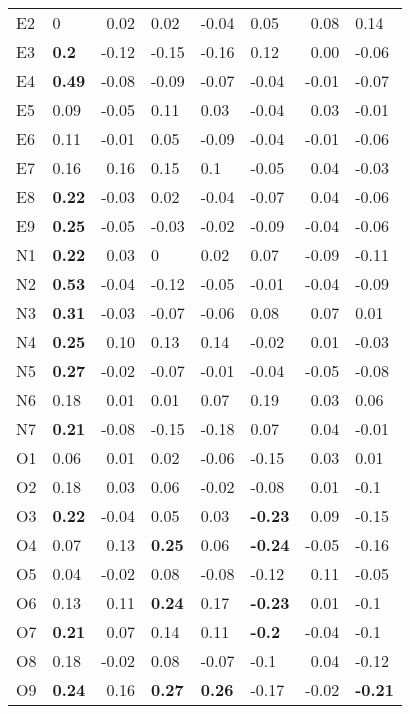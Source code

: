 \documentclass[man]{apa6}
\theoremstyle{definition}
\theoremstyle{definition}
\theoremstyle{definition}
\theoremstyle{remark}
\begin{document}
\begin{table}[ht]
\begin{tabular}{llrlllrl}
  E2 & 0 & 0.02 & 0.02 & -0.04 & 0.05 & 0.08 & 0.14 \\ 
  E3 & \textbf{0.2} & -0.12 & -0.15 & -0.16 & 0.12 & 0.00 & -0.06 \\ 
  E4 & \textbf{0.49} & -0.08 & -0.09 & -0.07 & -0.04 & -0.01 & -0.07 \\ 
  E5 & 0.09 & -0.05 & 0.11 & 0.03 & -0.04 & 0.03 & -0.01 \\ 
  E6 & 0.11 & -0.01 & 0.05 & -0.09 & -0.04 & -0.01 & -0.06 \\ 
  E7 & 0.16 & 0.16 & 0.15 & 0.1 & -0.05 & 0.04 & -0.03 \\ 
  E8 & \textbf{0.22} & -0.03 & 0.02 & -0.04 & -0.07 & 0.04 & -0.06 \\ 
  E9 & \textbf{0.25} & -0.05 & -0.03 & -0.02 & -0.09 & -0.04 & -0.06 \\ 
  N1 & \textbf{0.22} & 0.03 & 0 & 0.02 & 0.07 & -0.09 & -0.11 \\ 
  N2 & \textbf{0.53} & -0.04 & -0.12 & -0.05 & -0.01 & -0.04 & -0.09 \\ 
  N3 & \textbf{0.31} & -0.03 & -0.07 & -0.06 & 0.08 & 0.07 & 0.01 \\ 
  N4 & \textbf{0.25} & 0.10 & 0.13 & 0.14 & -0.02 & 0.01 & -0.03 \\ 
  N5 & \textbf{0.27} & -0.02 & -0.07 & -0.01 & -0.04 & -0.05 & -0.08 \\ 
  N6 & 0.18 & 0.01 & 0.01 & 0.07 & 0.19 & 0.03 & 0.06 \\ 
  N7 & \textbf{0.21} & -0.08 & -0.15 & -0.18 & 0.07 & 0.04 & -0.01 \\ 
  O1 & 0.06 & 0.01 & 0.02 & -0.06 & -0.15 & 0.03 & 0.01 \\ 
  O2 & 0.18 & 0.03 & 0.06 & -0.02 & -0.08 & 0.01 & -0.1 \\ 
  O3 & \textbf{0.22} & -0.04 & 0.05 & 0.03 & \textbf{-0.23} & 0.09 & -0.15 \\ 
  O4 & 0.07 & 0.13 & \textbf{0.25} & 0.06 & \textbf{-0.24} & -0.05 & -0.16 \\ 
  O5 & 0.04 & -0.02 & 0.08 & -0.08 & -0.12 & 0.11 & -0.05 \\ 
  O6 & 0.13 & 0.11 & \textbf{0.24} & 0.17 & \textbf{-0.23} & 0.01 & -0.1 \\ 
  O7 & \textbf{0.21} & 0.07 & 0.14 & 0.11 & \textbf{-0.2} & -0.04 & -0.1 \\ 
  O8 & 0.18 & -0.02 & 0.08 & -0.07 & -0.1 & 0.04 & -0.12 \\ 
  O9 & \textbf{0.24} & 0.16 & \textbf{0.27} & \textbf{0.26} & -0.17 & -0.02 & \textbf{-0.21} \\ 
   \hline
\end{tabular}
\endgroup
\end{table}
\end{document}
